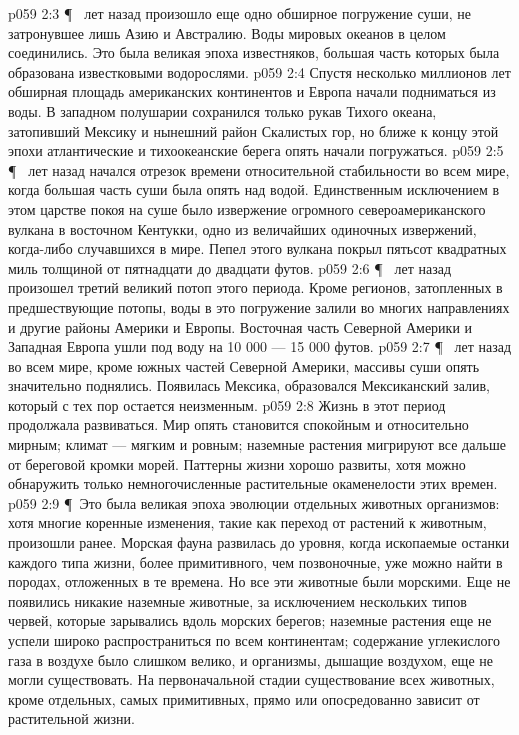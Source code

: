 \vs p059 2:3 \P\  лет назад произошло еще одно обширное погружение суши, не затронувшее лишь Азию и Австралию. Воды мировых океанов в целом соединились. Это была великая эпоха известняков, большая часть которых была образована известковыми водорослями.
\vs p059 2:4 Спустя несколько миллионов лет обширная площадь американских континентов и Европа начали подниматься из воды. В западном полушарии сохранился только рукав Тихого океана, затопивший Мексику и нынешний район Скалистых гор, но ближе к концу этой эпохи атлантические и тихоокеанские берега опять начали погружаться.
\vs p059 2:5 \P\  лет назад начался отрезок времени относительной стабильности во всем мире, когда большая часть суши была опять над водой. Единственным исключением в этом царстве покоя на суше было извержение огромного североамериканского вулкана в восточном Кентукки, одно из величайших одиночных извержений, когда\hyp{}либо случавшихся в мире. Пепел этого вулкана покрыл пятьсот квадратных миль толщиной от пятнадцати до двадцати футов.
\vs p059 2:6 \P\  лет назад произошел третий великий потоп этого периода. Кроме регионов, затопленных в предшествующие потопы, воды в это погружение залили во многих направлениях и другие районы Америки и Европы. Восточная часть Северной Америки и Западная Европа ушли под воду на 10 000 --- 15 000 футов.
\vs p059 2:7 \P\  лет назад во всем мире, кроме южных частей Северной Америки, массивы суши опять значительно поднялись. Появилась Мексика, образовался Мексиканский залив, который с тех пор остается неизменным.
\vs p059 2:8 Жизнь в этот период продолжала развиваться. Мир опять становится спокойным и относительно мирным; климат --- мягким и ровным; наземные растения мигрируют все дальше от береговой кромки морей. Паттерны жизни хорошо развиты, хотя можно обнаружить только немногочисленные растительные окаменелости этих времен.
\vs p059 2:9 \P\ Это была великая эпоха эволюции отдельных животных организмов: хотя многие коренные изменения, такие как переход от растений к животным, произошли ранее. Морская фауна развилась до уровня, когда ископаемые останки каждого типа жизни, более примитивного, чем позвоночные, уже можно найти в породах, отложенных в те времена. Но все эти животные были морскими. Еще не появились никакие наземные животные, за исключением нескольких типов червей, которые зарывались вдоль морских берегов; наземные растения еще не успели широко распространиться по всем континентам; содержание углекислого газа в воздухе было слишком велико, и организмы, дышащие воздухом, еще не могли существовать. На первоначальной стадии существование всех животных, кроме отдельных, самых примитивных, прямо или опосредованно зависит от растительной жизни.
